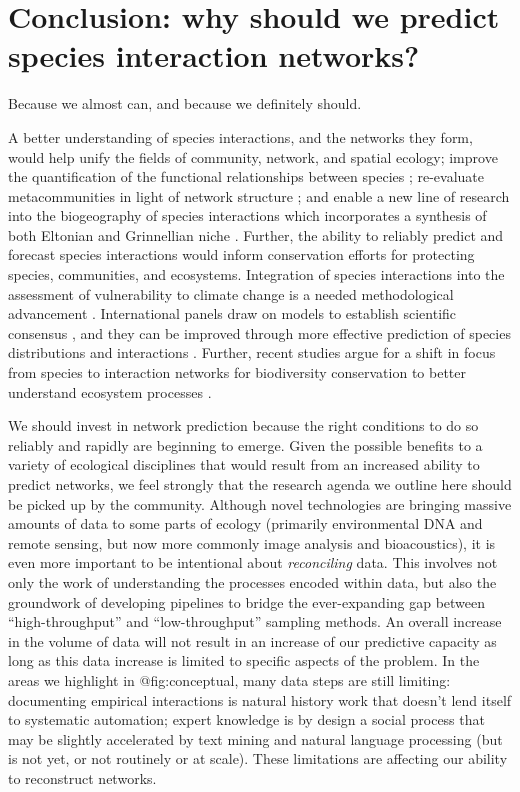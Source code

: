 \section{Conclusion: why should we predict species interaction
networks?}\label{conclusion-why-should-we-predict-species-interaction-networks}

Because we almost can, and because we definitely should.

A better understanding of species interactions, and the networks they
form, would help unify the fields of community, network, and spatial
ecology; improve the quantification of the functional relationships
between species \cite{Dehling2018BriElt, OConnor2020UnvFoo};
re-evaluate metacommunities in light of network structure
\cite{Guzman2019MulExt}; and enable a new line of research into the
biogeography of species interactions \cite{Massol2017ChaFou,
Braga2019SpaAna} which incorporates a synthesis of both Eltonian and
Grinnellian niche \cite{Gravel2019BriElt}. Further, the ability to
reliably predict and forecast species interactions would inform
conservation efforts for protecting species, communities, and
ecosystems. Integration of species interactions into the assessment of
vulnerability to climate change is a needed methodological advancement
\cite{Foden2016IucSsc}. International panels draw on models to establish
scientific consensus \cite{Araujo2019StaDis}, and they can be improved
through more effective prediction of species distributions and
interactions \cite{Syfert2014UsiSpe}. Further, recent studies argue for
a shift in focus from species to interaction networks for biodiversity
conservation to better understand ecosystem processes
\cite{Harvey2017BriEco}.

We should invest in network prediction because the right conditions to
do so reliably and rapidly are beginning to emerge. Given the possible
benefits to a variety of ecological disciplines that would result from
an increased ability to predict networks, we feel strongly that the
research agenda we outline here should be picked up by the community.
Although novel technologies are bringing massive amounts of data to some
parts of ecology (primarily environmental DNA and remote sensing, but
now more commonly image analysis and bioacoustics), it is even more
important to be intentional about \emph{reconciling} data. This involves
not only the work of understanding the processes encoded within data,
but also the groundwork of developing pipelines to bridge the
ever-expanding gap between ``high-throughput'' and ``low-throughput''
sampling methods. An overall increase in the volume of data will not
result in an increase of our predictive capacity as long as this data
increase is limited to specific aspects of the problem. In the areas we
highlight in @fig:conceptual, many data steps are still limiting:
documenting empirical interactions is natural history work that doesn't
lend itself to systematic automation; expert knowledge is by design a
social process that may be slightly accelerated by text mining and
natural language processing (but is not yet, or not routinely or at
scale). These limitations are affecting our ability to reconstruct
networks.


